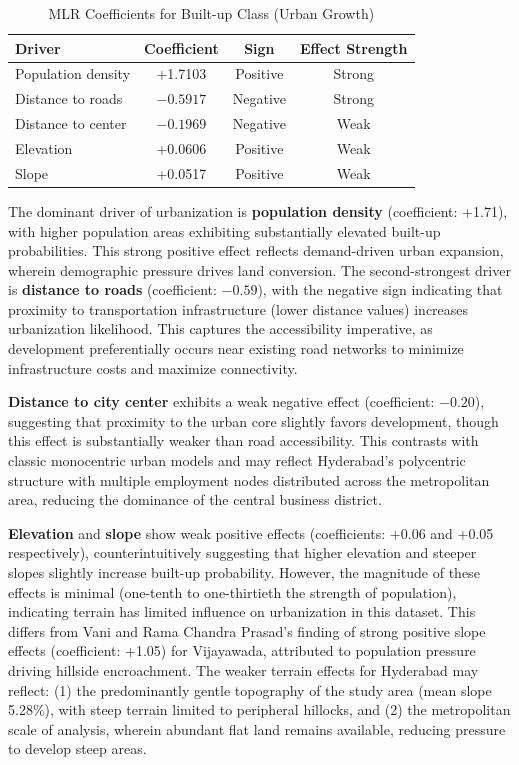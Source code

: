 \documentclass[conference]{IEEEtran}
\begin{document}
\begin{table}[!t]
\caption{MLR Coefficients for Built-up Class (Urban Growth)}
\label{tab:mlr_coefficients}
\centering
\small
\renewcommand{\arraystretch}{1.2}
\begin{tabular}{lccc}
\toprule
\textbf{Driver} & \textbf{Coefficient} & \textbf{Sign} & \textbf{Effect Strength} \\
\midrule
Population density & +1.7103 & Positive & Strong \\
Distance to roads & $-0.5917$ & Negative & Strong \\
Distance to center & $-0.1969$ & Negative & Weak \\
Elevation & +0.0606 & Positive & Weak \\
Slope & +0.0517 & Positive & Weak \\
\bottomrule
\end{tabular}
\end{table}

The dominant driver of urbanization is \textbf{population density} (coefficient: +1.71), with higher population areas exhibiting substantially elevated built-up probabilities. This strong positive effect reflects demand-driven urban expansion, wherein demographic pressure drives land conversion. The second-strongest driver is \textbf{distance to roads} (coefficient: $-0.59$), with the negative sign indicating that proximity to transportation infrastructure (lower distance values) increases urbanization likelihood. This captures the accessibility imperative, as development preferentially occurs near existing road networks to minimize infrastructure costs and maximize connectivity.

\textbf{Distance to city center} exhibits a weak negative effect (coefficient: $-0.20$), suggesting that proximity to the urban core slightly favors development, though this effect is substantially weaker than road accessibility. This contrasts with classic monocentric urban models and may reflect Hyderabad's polycentric structure with multiple employment nodes distributed across the metropolitan area, reducing the dominance of the central business district.

\textbf{Elevation} and \textbf{slope} show weak positive effects (coefficients: +0.06 and +0.05 respectively), counterintuitively suggesting that higher elevation and steeper slopes slightly increase built-up probability. However, the magnitude of these effects is minimal (one-tenth to one-thirtieth the strength of population), indicating terrain has limited influence on urbanization in this dataset. This differs from Vani and Rama Chandra Prasad's \cite{vani2022} finding of strong positive slope effects (coefficient: +1.05) for Vijayawada, attributed to population pressure driving hillside encroachment. The weaker terrain effects for Hyderabad may reflect: (1) the predominantly gentle topography of the study area (mean slope 5.28\%), with steep terrain limited to peripheral hillocks, and (2) the metropolitan scale of analysis, wherein abundant flat land remains available, reducing pressure to develop steep areas.
\end{document}
